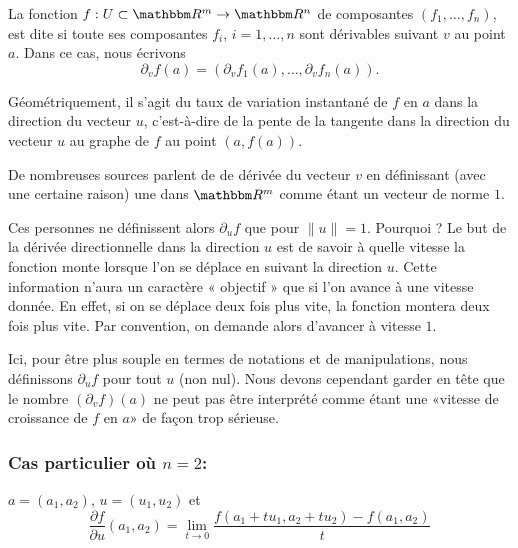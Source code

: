 \begin{definition}
  La fonction $f:U\subset\eR^m\to \eR^n$ de composantes $(f_1,\ldots, f_n)$, est dite  si toute ses composantes $f_i$, $i=1,\ldots, n$ sont dérivables suivant $v$ au point $a$. Dans ce cas, nous écrivons
  \begin{equation}
	\partial_v f(a)=\left(\partial_v f_1(a), \ldots, \partial_v f_n(a)\right).
  \end{equation}
\end{definition}

Géométriquement, il s'agit du taux de variation instantané de $f$ en $a$ dans la direction du vecteur $u$, c'est-à-dire de la pente de la tangente dans la direction du vecteur $u$ au graphe de $f$ au point $(a, f(a))$.

\begin{remark}
    De nombreuses sources parlent de de dérivée  du vecteur $v$ en définissant (avec une certaine raison) une  dans $\eR^m$ comme étant un vecteur de norme $1$.

    Ces personnes ne définissent alors \( \partial_uf\) que pour \( \| u \|=1\). Pourquoi ? Le but de la dérivée directionnelle dans la direction $u$ est de savoir à quelle vitesse la fonction monte lorsque l'on se déplace en suivant la direction $u$. Cette information n'aura un caractère « objectif » que si l'on avance à une vitesse donnée. En effet, si on se déplace deux fois plus vite, la fonction montera deux fois plus vite. Par convention, on demande alors d'avancer à vitesse \( 1\).

    Ici, pour être plus souple en termes de notations et de manipulations, nous définissons \( \partial_uf\) pour tout \( u\) (non nul). Nous devons cependant garder en tête que le nombre \( (\partial_vf)(a)\) ne peut pas être interprété comme étant une «vitesse de croissance de \( f\) en \( a\)» de façon trop sérieuse.
\end{remark}

\subsubsection*{Cas particulier où $n=2$:} $a = (a_1, a_2)$, $u =
(u_1,u_2)$ et
$$\frac{\partial f}{\partial u}(a_1, a_2) = \lim_{t\rightarrow
0}\frac{f(a_1+tu_1,a_2+tu_2) - f(a_1, a_2)}{t}$$

